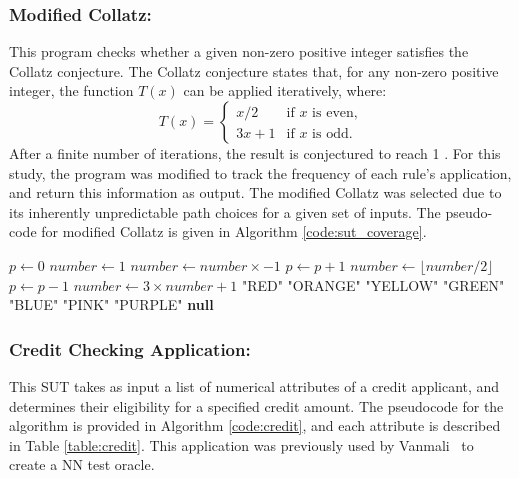 \documentclass[runningheads]{llncs}
\begin{document}
\subsubsection{Modified Collatz:} 
This program checks whether a given non-zero positive integer satisfies the Collatz conjecture. The Collatz conjecture states that, for any non-zero positive integer, the function $T(x)$ can be applied iteratively, where:
$$
T(x) =
\begin{cases}
    x/2 & \text{if } x \text{ is even,} \\
    3x+1 & \text{if } x \text{ is odd.}
\end{cases}
$$
After a finite number of iterations, the result is conjectured to reach 1 \cite{van2005collatz}. For this study, the program was modified to track the frequency of each rule’s application, and return this information as output. The modified Collatz was selected due to its inherently unpredictable path choices for a given set of inputs. The pseudo-code for modified Collatz is given in Algorithm \ref{code:sut_coverage}.

\begin{center}
\begin{algorithm}[!htb]
\label{code:sut_coverage}
\scriptsize
\begin{algorithmic}[1]
\State $p \gets 0$
    \State $number \gets 1$
\EndIf
{}
    \State $number \gets number \times -1$
\EndIf
{}
        \State $p \gets p + 1$
        \State $number \gets \lfloor number / 2 \rfloor$
    \Else
        \State $p \gets p - 1$
        \State $number \gets 3 \times number + 1$
    \EndIf
\EndWhile
{} \State \Return "RED"
    \State \Return "ORANGE"
    \State \Return "YELLOW"
    \State \Return "GREEN"
    \State \Return "BLUE"
    \State \Return "PINK"
    \State \Return "PURPLE"
\Else
    \State \Return \textbf{null}
\EndIf
\end{algorithmic}    
\end{algorithm}
\end{center}

\subsubsection{Credit Checking Application:} This SUT takes as input a list of numerical attributes of a credit applicant, and determines their eligibility for a specified credit amount. The pseudocode for the algorithm is provided in Algorithm \ref{code:credit}, and each attribute is described in Table \ref{table:credit}. This application was previously used by Vanmali~\cite{vanmali2002using} to create a NN test oracle.
\end{document}
